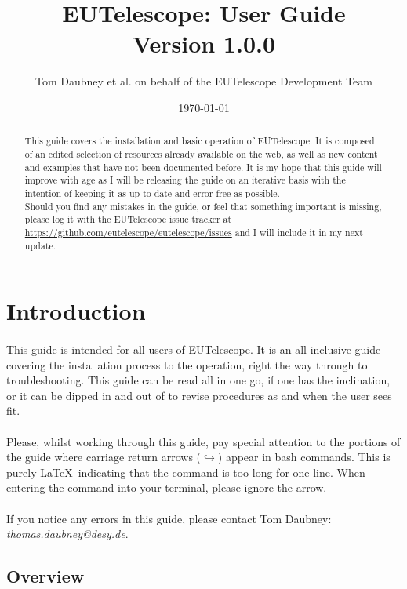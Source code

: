 \documentclass[11pt]{article}
\begin{document}
\title{%
	EUTelescope: User Guide\\
    \large Version 1.0.0
}
\date{\today}
\author{Tom Daubney et al. on behalf of the EUTelescope Development Team}
\maketitle
\begin{abstract}
This guide covers the installation and basic operation of EUTelescope. It is composed of an edited selection of resources already available on the web, as well as new content and examples that have not been documented before. It is my hope that this guide will improve with age as I will be releasing the guide on an iterative basis with the intention of keeping it as up-to-date and error free as possible.\\

Should you find any mistakes in the guide, or feel that something important is missing, please log it with the EUTelescope issue tracker at \url{https://github.com/eutelescope/eutelescope/issues} and I will include it in my next update.
\end{abstract}
\newpage
\tableofcontents
\newpage
\section{Introduction}
\paragraph{}
This guide is intended for all users of EUTelescope. It is an all inclusive guide covering the installation process to the operation, right the way through to troubleshooting. This guide can be read all in one go, if one has the inclination, or it can be dipped in and out of to revise procedures as and when the user sees fit.
\paragraph{}
Please, whilst working through this guide, pay special attention to the portions of the guide where carriage return arrows ($\hookrightarrow$) appear in bash commands. This is purely \LaTeX\  indicating that the command is too long for one line. When entering the command into your terminal, please ignore the arrow.\\ \\
If you notice any errors in this guide, please contact Tom Daubney: \textit{thomas.daubney@desy.de}. 
\subsection{Overview}
\end{document}
